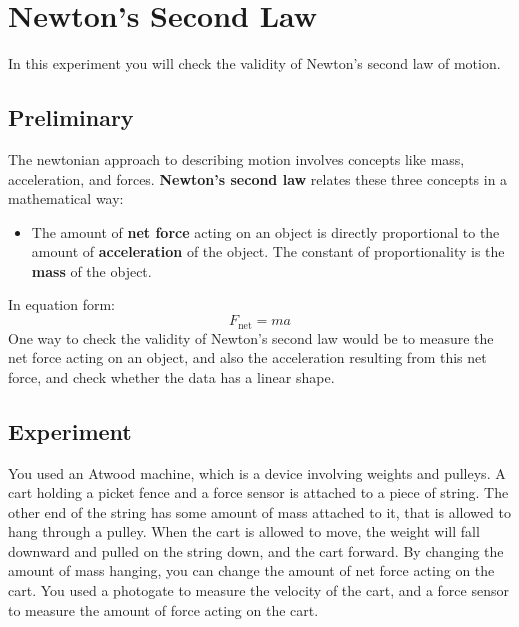 \setcounter{chapter}{4}
\chapter{Newton's Second Law}
In this experiment you will check the validity of Newton's second law of motion.
\section{Preliminary}
The newtonian approach to describing motion involves concepts like mass, acceleration, and forces. \textbf{Newton's second law} relates these three concepts in a mathematical way:
\begin{itemize}
    \item The amount of \textbf{net force} acting on an object is directly proportional to the amount of \textbf{acceleration} of the object. The constant of proportionality is the \textbf{mass} of the object.
\end{itemize}
In equation form:
\begin{equation}
    F_{\text{net}} = m a
    \label{eq:04.Fma}
\end{equation}
One way to check the validity of Newton's second law would be to measure the net force acting on an object, and also the acceleration resulting from this net force, and check whether the data has a linear shape.
\section{Experiment}
You used an Atwood machine, which is a device involving weights and pulleys. A cart holding a picket fence and a force sensor is attached to a piece of string. The other end of the string has some amount of mass attached to it, that is allowed to hang through a pulley. When the cart is allowed to move, the weight will fall downward and pulled on the string down, and the cart forward. By changing the amount of mass hanging, you can change the amount of net force acting on the cart. You used a photogate to measure the velocity of the cart, and a force sensor to measure the amount of force acting on the cart.
